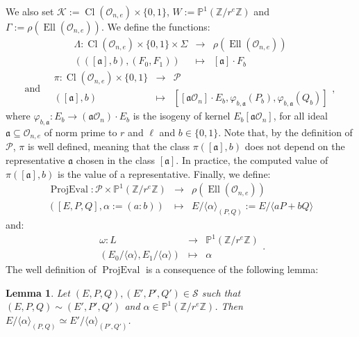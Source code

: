 \documentclass[a4paper,10pt,notitlepage]{report}
\theoremstyle{definition}
\theoremstyle{plain}
\newtheorem{Lemma}[Definition]{Lemma}
\theoremstyle{definition}
\newcommand{\Z}{\mathbb{Z}}
\newcommand{\m}[1]{\mathcal{#1}}
\newcommand{\mO}{\mathcal{O}}
\renewcommand{\(}{\left(}
\renewcommand{\)}{\right)}
\renewcommand{\P}{\mathbb{P}}
\newcommand{\mf}[1]{\mathfrak{#1}}
\DeclareMathOperator{\Cl}{Cl}
\DeclareMathOperator{\Ell}{Ell}
\DeclareMathOperator{\ProjEval}{ProjEval}
\begin{document}
We also set $\m{K}:=\Cl(\mO_{n,e})\times\{0,1\}$, $W:=\P^1(\Z/r^e\Z)$ and $\Gamma:=\rho(\Ell(\mO_{n,e}))$. We define the functions:
\[\begin{array}{rcl}
\Lambda : \Cl(\mO_{n,e})\times\{0,1\}\times \Sigma & \longrightarrow & \rho(\Ell(\mO_{n,e}))\\
(([\mf{a}], b),(F_0,F_1)) & \longmapsto & [\mf{a}]\cdot F_b
\end{array}\]
\[\mbox{and} \quad \begin{array}{rcl}
\pi : \Cl(\mO_{n,e})\times\{0,1\} & \longrightarrow & \m{P}\\
([\mf{a}], b) & \longmapsto & [[\mf{a}\mO_n]\cdot E_b,\varphi_{b,\mf{a}}(P_b),\varphi_{b,\mf{a}}(Q_b)]
\end{array},\]
where $\varphi_{b,\mf{a}}: E_b\longrightarrow (\mf{a}\mO_n)\cdot E_b$ is the isogeny of kernel $E_b[\mf{a}\mO_n]$, for all ideal $\mf{a}\subseteq\mO_{n,e}$ of norm prime to $r$ and $\ell$ and $b\in\{0,1\}$. Note that, by the definition of $\m{P}$, $\pi$ is well defined, meaning that the class $\pi([\mf{a}],b)$ does not depend on the representative $\mf{a}$ chosen in the class $[\mf{a}]$.  In practice, the computed value of $\pi([\mf{a}],b)$ is the value of a representative. Finally, we define:
\[\begin{array}{rcl}
\ProjEval :\m{P}\times \P^1(\Z/r^e\Z) & \longrightarrow & \rho(\Ell(\mO_{n,e}))\\
([E,P,Q],\alpha:=(a:b)) & \longmapsto & E/\langle\alpha\rangle_{(P,Q)}:=E/\langle aP+bQ\rangle
\end{array}\]
and:
\[\begin{array}{rcl}
\omega : L & \longrightarrow & \P^1(\Z/r^e\Z)\\
(E_0/\langle\alpha\rangle,E_1/\langle\alpha\rangle) & \longmapsto & \alpha
\end{array}.\]
The well definition of $\ProjEval$ is a consequence of the following lemma:

\begin{Lemma}\label{Lemma 9}
Let $(E,P,Q), (E',P',Q')\in \m{S}$ such that $(E,P,Q)\sim (E',P',Q')$ and $\alpha\in\P^1(\Z/r^e\Z)$.  Then $E/\langle\alpha\rangle_{(P,Q)}\simeq E'/\langle\alpha\rangle_{(P',Q')}$.
\end{Lemma}
\end{document}

